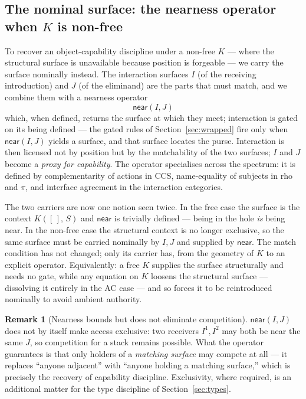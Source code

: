 \documentclass[11pt]{article}
\theoremstyle{definition}
\newtheorem{remark}[definition]{Remark}
\theoremstyle{plain}
\newcommand{\near}{\mathsf{near}}
\newcommand{\Kctx}[1]{K([\,],\, #1)}
\begin{document}
\subsection{The nominal surface: the nearness operator when \texorpdfstring{$K$}{K} is non-free}

To recover an object-capability discipline under a non-free $K$ --- where
the structural surface is unavailable because position is forgeable --- we
carry the surface nominally instead. The interaction surfaces $I$ (of the
receiving introduction) and $J$ (of the eliminand) are the parts that must
match, and we combine them with a nearness operator
\[
  \near(I, J)
\]
which, when defined, returns the surface at which they meet; interaction
is gated on its being defined --- the gated rules of
Section~\ref{sec:wrapped} fire only when $\near(I,J)$ yields a surface,
and that surface locates the purse. Interaction is then licensed not by
position but by the matchability of the two surfaces; $I$ and $J$ become a
\emph{proxy for capability}. The operator specialises across the
spectrum: it is defined by complementarity of actions in CCS,
name-equality of subjects in rho and $\pi$, and interface agreement in the
interaction categories.

The two carriers are now one notion seen twice. In the free case the
surface is the context $\Kctx{S}$ and $\near$ is trivially defined ---
being in the hole \emph{is} being near. In the non-free case the
structural context is no longer exclusive, so the same surface must be
carried nominally by $I, J$ and supplied by $\near$. The match condition
has not changed; only its carrier has, from the geometry of $K$ to an
explicit operator. Equivalently: a free $K$ supplies the surface
structurally and needs no gate, while any equation on $K$ loosens the
structural surface --- dissolving it entirely in the AC case --- and so
forces it to be reintroduced nominally to avoid ambient authority.

\begin{remark}[Nearness bounds but does not eliminate competition]
$\near(I,J)$ does not by itself make access exclusive: two receivers
$I^1, I^2$ may both be near the same $J$, so competition for a stack
remains possible. What the operator guarantees is that only holders of a
\emph{matching surface} may compete at all --- it replaces ``anyone
adjacent'' with ``anyone holding a matching surface,'' which is precisely
the recovery of capability discipline. Exclusivity, where required, is an
additional matter for the type discipline of Section~\ref{sec:types}.
\end{remark}
\end{document}
